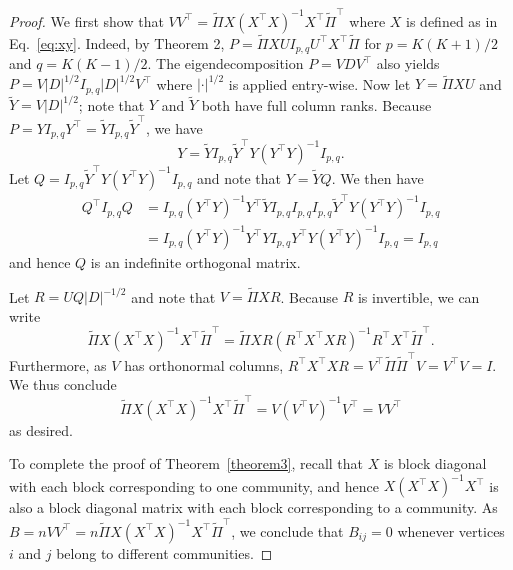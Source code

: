 \documentclass[12pt]{article}
\begin{document}
\begin{proof}
We first show that $V V^\top =
\tilde{\Pi} X (X^\top X)^{-1} X^\top \tilde{\Pi}^{\top} $ where $X$ is 
defined as in Eq.~\eqref{eq:xy}. Indeed, by Theorem 2, 
\(P = \tilde{\Pi} X U I_{p, q} U^\top X^\top \tilde{\Pi}\) for $p = K(K+1)/2$ and $q = K(K-1)/2$. 
The eigendecomposition \(P = V D V^\top\) also yields $P = V
|D|^{1/2} I_{p, q} |D|^{1/2} V^\top$ where \(|\cdot|^{1/2}\) is
applied entry-wise. Now let $Y = \tilde{\Pi} XU$ and $\tilde{Y} = V|D|^{1/2}$; note that
$Y$ and $\tilde{Y}$ both have full column ranks. 
Because $P = Y I_{p,q} Y^{\top} = \tilde{Y} I_{p,q} \tilde{Y}^{\top}$, we have
$$Y = \tilde{Y} I_{p,q} \tilde{Y}^{\top} Y (Y^{\top} Y)^{-1} I_{p,q}.$$
Let $Q = I_{p,q} \tilde{Y}^{\top} Y (Y^{\top} Y)^{-1} I_{p,q}$ and note that
$Y = \tilde{Y} Q$. We then have
\begin{equation*}
  \begin{split}
  Q^{\top} I_{p,q} Q &= I_{p,q} (Y^{\top} Y)^{-1} Y^{\top} \tilde{Y} I_{p,q}
I_{p,q} I_{p,q} \tilde{Y}^{\top} Y (Y^{\top} Y)^{-1} I_{p,q} \\ 
&= I_{p,q} (Y^{\top} Y)^{-1} Y^{\top} Y I_{p,q}
Y^{\top} Y (Y^{\top} Y)^{-1} I_{p,q} =  I_{p,q}
\end{split}
\end{equation*}
and hence $Q$ is an indefinite orthogonal matrix. 

Let $R = U Q |D|^{-1/2}$ and note that $V = \tilde{\Pi} XR$. Because $R$ is
invertible, we can write
$$\tilde{\Pi} X (X^{\top} X)^{-1} X^{\top} \tilde{\Pi}^{\top} =
\tilde{\Pi} X R (R^{\top} X^{\top} X R)^{-1}
R^{\top} X^{\top} \tilde{\Pi}^{\top}.$$ 
Furthermore, as $V$ has orthonormal columns, $R^{\top} X^{\top} X R =
V^{\top} \tilde{\Pi} \tilde{\Pi}^{\top} V = V^{\top} V = I$. We thus conclude
$$\tilde{\Pi} X (X^{\top} X)^{-1} X^{\top} \tilde{\Pi}^{\top} = V (V^{\top} V)^{-1} V^{\top} = V V^{\top}$$
as desired.

To complete the proof of Theorem~\ref{theorem3}, recall that \(X\) 
is block diagonal with each block corresponding to one community, 
and hence \(X (X^\top X)^{-1} X^\top\) is also a
block diagonal matrix with each block corresponding to a community. 
As $B = n VV^{\top} = n \tilde{\Pi} X (X^\top X)^{-1} X^\top \tilde{\Pi}^{\top}$, 
we conclude that $B_{ij} = 0$ 
whenever vertices $i$ and $j$ belong to different communities.  
\end{proof}
\end{document}
